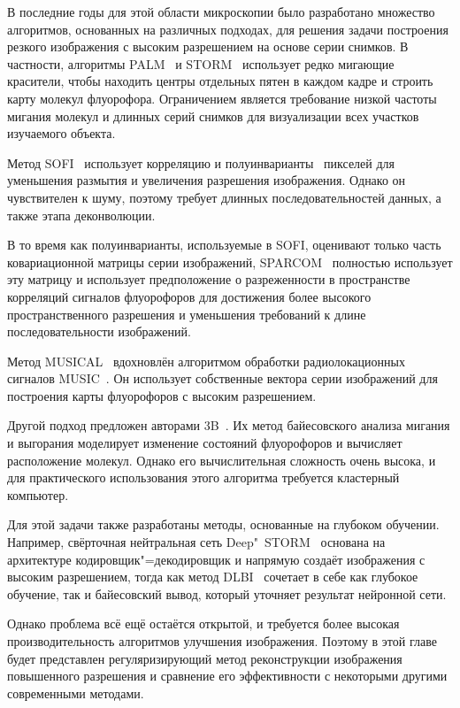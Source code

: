 В последние годы для этой области микроскопии было разработано множество алгоритмов, основанных на различных подходах, для решения задачи построения резкого изображения с высоким разрешением на основе серии снимков. В частности, алгоритмы PALM~\cite{betzig2006imaging} и STORM~\cite{rust2006sub} использует редко мигающие красители, чтобы находить центры отдельных пятен в каждом кадре и строить карту молекул флуорофора. Ограничением является требование низкой частоты мигания молекул и длинных серий снимков для визуализации всех участков изучаемого объекта.

Метод SOFI~\cite{dertinger2009fast, dertinger2010achieving} использует корреляцию и полуинварианты~\cite{75086, малахов1978кумулянтный} пикселей для уменьшения размытия и увеличения разрешения изображения. Однако он чувствителен к шуму, поэтому требует длинных последовательностей данных, а также этапа деконволюции.

В то время как полуинварианты, используемые в SOFI, оценивают только часть ковариационной матрицы серии изображений, SPARCOM~\cite{Solomon:18} полностью использует эту матрицу и использует предположение о разреженности в пространстве корреляций сигналов флуорофоров для достижения более высокого пространственного разрешения и уменьшения требований к длине последовательности изображений.

Метод MUSICAL~\cite{agarwal2016multiple} вдохновлён алгоритмом обработки радиолокационных сигналов MUSIC~\cite{schmidt1986multiple}. Он использует собственные вектора серии изображений для построения карты флуорофоров с высоким разрешением.

Другой подход предложен авторами 3B~\cite{cox2012bayesian}. Их метод байесовского анализа мигания и выгорания моделирует изменение состояний флуорофоров и вычисляет расположение молекул. Однако его вычислительная сложность очень высока, и для практического использования этого алгоритма требуется кластерный компьютер.

Для этой задачи также разработаны методы, основанные на глубоком обучении. Например, свёрточная нейтральная сеть Deep"~STORM~\cite{Nehme:18} основана на архитектуре кодировщик"=декодировщик и напрямую создаёт изображения с высоким разрешением, тогда как метод DLBI~\cite{10.1093/bioinformatics/bty241} сочетает в себе как глубокое обучение, так и байесовский вывод, который уточняет результат нейронной сети. 

Однако проблема всё ещё остаётся открытой, и требуется более высокая производительность алгоритмов улучшения изображения. Поэтому в этой главе будет представлен регуляризирующий метод реконструкции изображения повышенного разрешения и сравнение его эффективности с некоторыми другими современными методами.

